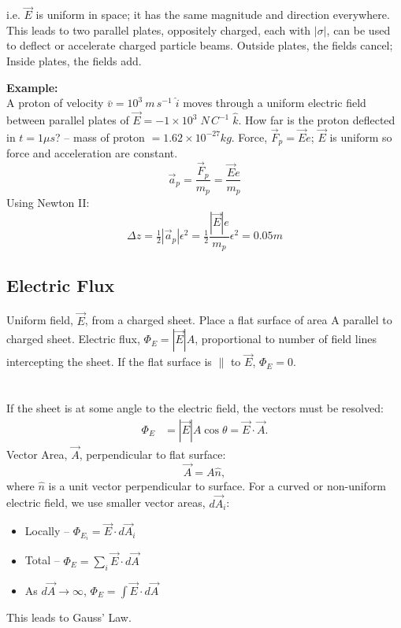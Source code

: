 \documentclass[a4paper, 11pt, normalem]{report}
\begin{document}
i.e. $\vec{E}$ is uniform in space; it has the same magnitude and direction everywhere.
This leads to two parallel plates, oppositely charged, each with $|\sigma|$, can be used to deflect or accelerate charged particle beams.
Outside plates, the fields cancel; Inside plates, the fields add.

\textbf{Example:}\\
A proton of velocity $\bar{v} = 10^{3} \: m \, s^{-1} \; \hat{i}$ moves through a uniform electric field between parallel plates of $\vec{E} = -1 \times 10^{3} \; N \, C^{-1} \; \hat{k}$. 
How far is the proton deflected in $t = 1 \mu s$? -- mass of proton $= 1.62 \times 10^{-27} kg$.
Force, $\vec{F}_{p} = \vec{E}e$; $\vec{E}$ is uniform so force and acceleration are constant.
\begin{equation}
    \vec{a}_{p} = \frac{\vec{F}_{p}}{m_{p}} = \frac{\vec{E}e}{m_{p}}
\end{equation}
Using Newton \RN{2}:
\begin{equation}
    \Delta z = \tfrac{1}{2}|\vec{a}_{p}|\epsilon^{2} = \tfrac{1}{2} \frac{|\vec{E}|e}{m_{p}}\epsilon^{2} = 0.05m
\end{equation}

\section{Electric Flux}
Uniform field, $\vec{E}$, from a charged sheet. 
Place a flat surface of area A parallel to charged sheet.
Electric flux, $\Phi_{E} = |\vec{E}|A$, proportional to number of field lines intercepting the sheet. 
If the flat surface is $\parallel$ to $\vec{E}$, $\Phi_{E} = 0$.

\chapter{}
If the sheet is at some angle to the electric field, the vectors must be resolved:
\begin{align}
    \Phi_{E} &= |\vec{E}|A\cos\theta = \vec{E} \cdot \vec{A}.
\end{align}
Vector Area, $\vec{A}$, perpendicular to flat surface:
\begin{equation}
    \vec{A} = A\hat{n},
\end{equation}
where $\hat{n}$ is a unit vector perpendicular to surface.
For a curved or non-uniform electric field, we use smaller vector areas, $d\vec{A}_{i}$: 
\begin{itemize}
    \item Locally -- $\Phi_{E_{i}} = \vec{E} \cdot d\vec{A}_{i}$ 
    \item Total -- $\Phi_{E} = \sum_{i} \vec{E} \cdot d\vec{A}$ 
    \item As $d\vec{A} \to \infty$, $\Phi_{E} = \int \vec{E} \cdot d\vec{A}$ 
\end{itemize}
This leads to Gauss' Law.
\end{document}
